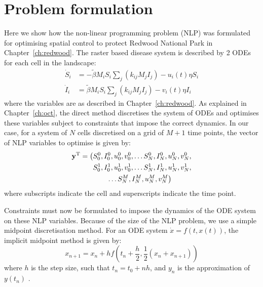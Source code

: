 \section{Problem formulation\label{app:redwood_form}}

Here we show how the non-linear programming problem (NLP) was formulated for optimising spatial control to protect Redwood National Park in Chapter~\ref{ch:redwood}. The raster based disease system is described by 2 ODEs for each cell in the landscape:
\begin{subequations}
    \label{eqn:appB:approx_model}
    \begin{align}
        \dot{S}_i &= -\tilde{\beta}M_iS_i\sum_j\left(k_{ij}M_jI_j\right) - u_i(t)\eta{}S_i\\
        \dot{I}_i &= \tilde{\beta}M_iS_i\sum_j\left(k_{ij}M_jI_j\right) - v_i(t)\eta{}I_i
    \end{align}
\end{subequations}
where the variables are as described in Chapter~\ref{ch:redwood}. As explained in Chapter~\ref{ch:oct}, the direct method discretises the system of ODEs and optimises these variables subject to constraints that impose the correct dynamics. In our case, for a system of $N$ cells discretised on a grid of $M+1$ time points, the vector of NLP variables to optimise is given by:
\begin{equation}
    \begin{split}
    \mathbf{\bm{y}}^\mathrm{T} = \bigl({}&S_0^0, I_0^0, u_0^0, v_0^0, \ldots S_N^0, I_N^0, u_N^0, v_N^0, \\
    & S_0^1, I_0^1, u_0^1, v_0^1, \ldots S_N^1, I_N^1, u_N^1, v_N^1, \\
    & \qquad\ldots S_N^M, I_N^M, u_N^M, v_N^M\bigr)
    \end{split}
\end{equation}
where subscripts indicate the cell and superscripts indicate the time point.

Constraints must now be formulated to impose the dynamics of the ODE system on these NLP variables. Because of the size of the NLP problem, we use a simple midpoint discretisation method. For an ODE system $\dot{x} = f(t, x(t))$, the implicit midpoint method is given by:
\begin{equation}
    x_{n+1} = x_n + hf\left(t_n+\frac{h}{2}, \frac{1}{2}(x_n+x_{n+1})\right)
\end{equation}
where $h$ is the step size, such that $t_n=t_0+nh$, and $y_n$ is the approximation of $y(t_n)$ \citep[p.~100]{betts_practical_2010}.

